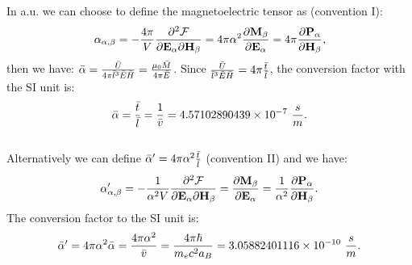 \documentclass[12pt,a4paper]{article}
\def\baralpha{4.57102890439\times 10^{-7}}
\def\baralphap{3.05882401116\times 10^{-10}}
\begin{document}
{\color{web-blue} 

In a.u. we can choose to define the magnetoelectric tensor as (convention I):
\begin{equation}
\alpha_{\alpha,\beta}=-{4 \pi\over V} {\partial^2 \mathcal{F} \over \partial 
{\bf E}_{\alpha} \partial {\bf H}_{\beta}}= 4 \pi \alpha^2 {\partial {\bf M}_{\beta} \over \partial {\bf E}_{\alpha}}= 4 \pi
{\partial {\bf P}_{\alpha} \over \partial {\bf H}_{\beta}}, 
\end{equation}
then we have: $\bar \alpha=
{\bar U \over 4 \pi \bar l^3 \bar E \bar H}={\mu_0 \bar M \over 4 \pi \bar E}$.
Since
${\bar U \over \bar l^3 \bar E \bar H}=4 \pi {\bar t \over \bar l }$, 
the conversion factor with the SI unit is:
\begin{equation}
\bar \alpha = {\bar t \over \bar l} = {1\over \bar v}=\baralpha\ {s \over m}.
\end{equation}
\\
Alternatively we can define $\bar \alpha'=4 \pi \alpha^2 {\bar t \over \bar l}$ 
(convention II) and we have:
\begin{equation}
\alpha'_{\alpha,\beta}=-{1 \over \alpha^2 V} 
{\partial^2 \mathcal{F} \over \partial {\bf E}_{\alpha} 
\partial {\bf H}_{\beta}}= {\partial {\bf M}_{\beta} \over 
\partial {\bf E}_{\alpha}}= {1\over \alpha^2}
{\partial {\bf P}_{\alpha} \over \partial {\bf H}_{\beta}}. 
\end{equation}
The conversion factor to the SI unit is: 
\begin{equation}
\bar \alpha'= 4 \pi \alpha^2 \bar \alpha = {4 \pi \alpha^2\over \bar v}
={4 \pi \hbar \over m_e c^2 a_B}
=\baralphap\ {s \over m}.
\end{equation}
}
\\
\end{document}
